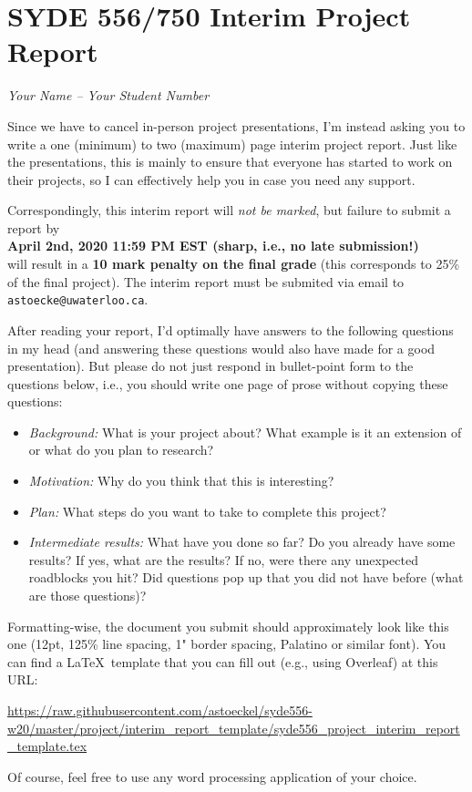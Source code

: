 \documentclass[12pt,letterpaper,oneside]{article}
\begin{document}
	\section*{SYDE 556/750 Interim Project Report}

	\emph{Your Name -- Your Student Number}

	Since we have to cancel in-person project presentations, I'm instead asking you to write a one (minimum) to two (maximum) page interim project report. Just like the presentations, this is mainly to ensure that everyone has started to work on their projects, so I can effectively help you in case you need any support.

	Correspondingly, this interim report will \emph{not be marked}, but failure to submit a report by\\[0.25cm]
	{\centering\bf April 2nd, 2020 11:59 PM EST (sharp, i.e., no late submission!)\\[0.25cm]}
	will result in a \textbf{10 mark penalty on the final grade} (this corresponds to 25\% of the final project). The interim report must be submited via email to \texttt{astoecke@uwaterloo.ca}.

	After reading your report, I'd optimally have answers to the following questions in my head (and answering these questions would also have made for a good presentation). But please do not just respond in bullet-point form to the questions below, i.e., you should write one page of prose without copying these questions:
	\begin{itemize}
		\item \emph{Background:} What is your project about? What example is it an extension of or what do you plan to research?
		\item \emph{Motivation:} Why do you think that this is interesting?
		\item \emph{Plan:} What steps do you want to take to complete this project?
		\item \emph{Intermediate results:} What have you done so far? Do you already have some results? If yes, what are the results? If no, were there any unexpected roadblocks you hit? Did questions pop up that you did not have before (what are those questions)?
	\end{itemize}

	Formatting-wise, the document you submit should approximately look like this one (12pt, 125\% line spacing, 1" border spacing, Palatino or similar font). You can find a \LaTeX\ template that you can fill out (e.g., using Overleaf) at this URL:
	\begin{center}
		\small
		\url{https://raw.githubusercontent.com/astoeckel/syde556-w20/master/project/interim_report_template/syde556_project_interim_report_template.tex}
	\end{center}

	Of course, feel free to use any word processing application of your choice.
\end{document}
